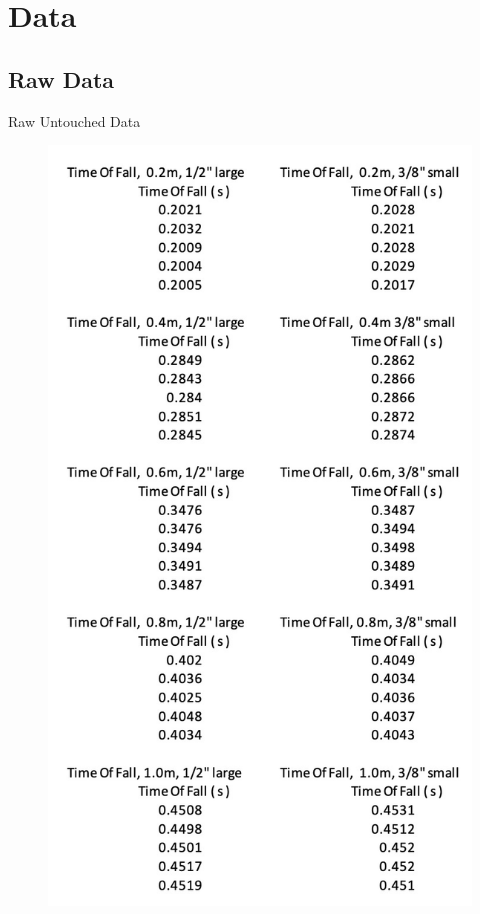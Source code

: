 \chapter{Data}
\section{Raw Data}
Raw Untouched Data
\begin{figure}[htpb]
  \centerline{\includegraphics[scale=0.5]{resources/RawDataCompiled.jpg}}
  \end{figure}

